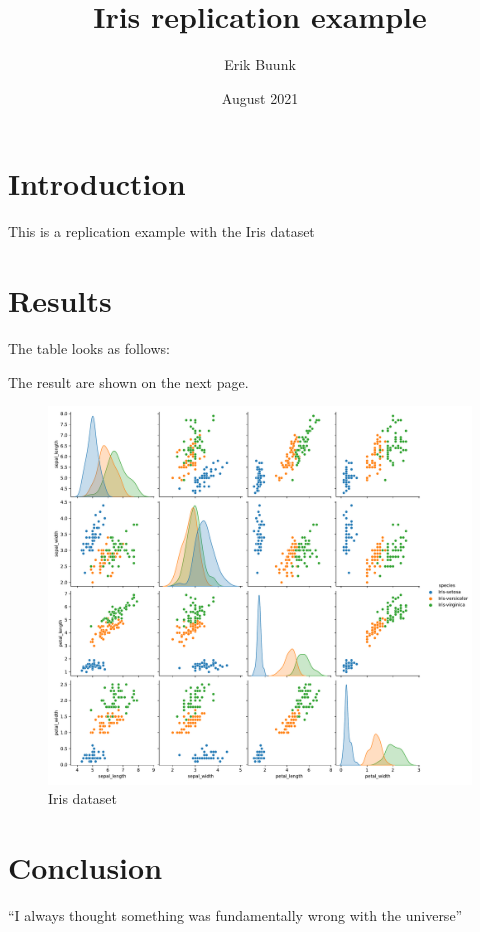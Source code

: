 \documentclass{article}
\title{Iris replication example}
\author{Erik Buunk}
\date{August 2021}
\begin{document}
\maketitle

\section{Introduction}
This is a replication example with the Iris dataset

\section{Results}
The table looks as follows:




The result are shown on the next page.

\begin{figure}
\centering
\includegraphics[scale=0.35]{figures/figure.pdf}
\caption{Iris dataset}
\label{fig:iris}
\end{figure}

\section{Conclusion}
``I always thought something was fundamentally wrong with the universe'' \citep{adams1995hitchhiker}



\end{document}
